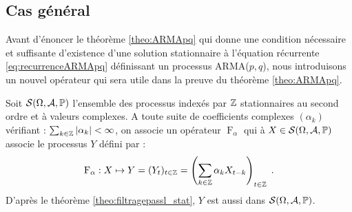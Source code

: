 %
%


\subsection{Cas g\'en\'eral}\label{sec:cas_general}
Avant d'\'enoncer le th\'eor\`eme \ref{theo:ARMApq} qui donne
une condition n\'ecessaire et suffisante d'existence d'une solution stationnaire
\`a l'\'equation r\'ecurrente \eqref{eq:recurrenceARMApq}
d\'efinissant un processus ARMA($p,q$), nous introduisons un nouvel op\'erateur
qui sera utile dans la preuve du th\'eor\`eme \ref{theo:ARMApq}.

Soit $\mathcal{S}(\Omega,\mathcal{A},\mathbb{P})$ l'ensemble des processus index\'es par $\mathbb{Z}$
stationnaires au second ordre et \`a valeurs complexes. A toute suite de
coefficients complexes $(\alpha_k)$ v\'erifiant :
$\sum_{k\in\mathbb{Z}}|\alpha_k|<\infty$, on associe un op\'erateur
$\operatorname{F}_\alpha$ qui \`a $X\in\mathcal{S}(\Omega,\mathcal{A},\mathbb{P})$ associe le processus $Y$
d\'efini par :
$$
\operatorname{F}_\alpha:X\mapsto Y=(Y_t)_{t\in\mathbb{Z}}=\left(\sum_{k\in\mathbb{Z}}\alpha_k X_{t-k}\right)_{t\in\mathbb{Z}}\; .
$$
D'apr\`es le th\'eor\`eme \ref{theo:filtragepassl_stat}, $Y$ est aussi dans $\mathcal{S}(\Omega,\mathcal{A},\mathbb{P})$.

